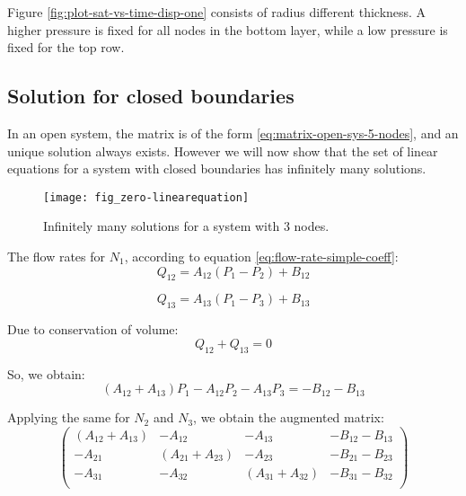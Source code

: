 	Figure \ref{fig:plot-sat-vs-time-disp-one} consists of radius different thickness. A higher pressure is fixed for all nodes in the bottom layer, while a low pressure is fixed for the top row.

	
\subsection{Solution for closed boundaries} \label{sec:closed-boundary-triangle}

	In an open system, the matrix is of the form \ref{eq:matrix-open-sys-5-nodes}, and an unique solution always exists. However we will now show that the set of linear equations for a system with closed boundaries has infinitely many solutions.

	\begin{figure}[H]
		\centering
		\texttt{[image: fig\_zero-linearequation]}
		\caption{Infinitely many solutions for a system with 3 nodes.}
		\label{fig:zero-la-triangle}
	\end{figure}
	
	The flow rates for $N_{1}$, according to equation \ref{eq:flow-rate-simple-coeff}:
	\begin{equation}
		Q_{12} = A_{12}(P_1 - P_2) + B_{12}
	\end{equation}
	
	\begin{equation}
		Q_{13} = A_{13}(P_1 - P_3) + B_{13}
	\end{equation}
	
	Due to conservation of volume:
	\begin{equation}
		Q_{12} + Q_{13} = 0
	\end{equation}
	
	So, we obtain:
	\begin{equation}
		(A_{12} + A_{13})P_1 - A_{12}P_2 - A_{13}P_3 = -B_{12} - B_{13}
	\end{equation}
	
	Applying the same for $N_2$ and $N_3$, we obtain the augmented matrix:
	\begin{equation}
		\begin{pmatrix}
			(A_{12} + A_{13}) & -A_{12} & -A_{13} & -B_{12} - B_{13} \\
			-A_{21} & (A_{21} + A_{23}) & -A_{23} & -B_{21} - B_{23} \\
			-A_{31} & -A_{32} & (A_{31} + A_{32}) & -B_{31} - B_{32} \\
		\end{pmatrix}
	\end{equation}
	

